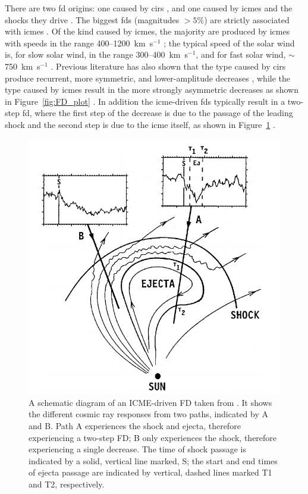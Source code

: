There are two \gls{fd} origins: one caused by \glspl{cir} \citep{dumbovic_forbush_2016}, and one caused by \glspl{icme} and the shocks they drive \citep{belov_forbush_2008}. The biggest \glspl{fd} (magnitudes $> 5\%$) are strictly associated with \glspl{icme} \citep{belov_what_2001}. Of the kind caused by \glspl{icme}, the majority are produced by \glspl{icme} with speeds in the range 400--1200~km~s$^{-1}$ \citep{lingri_forbush_2016}; the typical speed of the solar wind is, for slow solar wind, in the range 300--400~km~s$^{-1}$, and for fast solar wind, $\sim$750~km~s$^{-1}$ \citep{owens_heliospheric_2013}. Previous literature has also shown that the type caused by \glspl{cir} produce recurrent, more symmetric, and lower-amplitude decreases \citep{dumbovic_cosmic_2012}, while the type caused by \glspl{icme} result in the more strongly asymmetric decreases as shown in Figure~\ref{fig:FD_plot} \citep{lockwood_forbush_1971, cane_coronal_2000, dumbovic_cosmic_2012}. In addition the \gls{icme}-driven \glspl{fd} typically result in a two-step \gls{fd}, where the first step of the decrease is due to the passage of the leading shock and the second step is due to the \gls{icme} itself, as shown in Figure~\ref{fig:FD_CME} \citep{cane_coronal_2000}.

\begin{figure}[ht!]
	\centering
	\includegraphics[width=0.75\columnwidth]{FD_CME.png}
	\caption{A schematic diagram of an ICME-driven FD taken from \citet{cane_coronal_2000}. It shows the different cosmic ray responses from two paths, indicated by A and B. Path A experiences the shock and ejecta, therefore experiencing a two-step FD; B only experiences the shock, therefore experiencing a single decrease. The time of shock passage is indicated by a solid, vertical line marked, S; the start and end times of ejecta passage are indicated by vertical, dashed lines marked T1 and T2, respectively.}
	\label{fig:FD_CME}
\end{figure}

